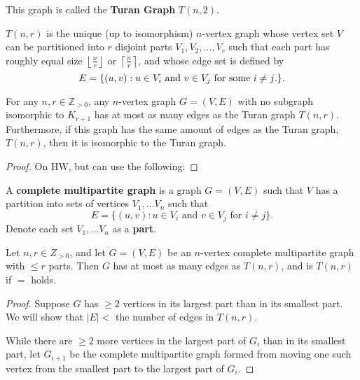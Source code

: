 
This graph is called the \textbf{Turan Graph} \( T(n, 2) \).

\begin{definition}
	\( T(n, r) \) is the unique (up to isomorphism) \( n \)-vertex graph whose vertex set \( V \) can be partitioned into \( r \) disjoint parts \( V_{1},V_{2},\ldots,V_r \) such that each part has roughly equal size \( \left\lfloor \frac{n}{r} \right\rfloor \) or \( \left\lceil \frac{n}{r} \right\rceil  \), and whose edge set is defined by \[
		E = \{(u, v) : u \in V_i \text{ and } v \in V_j \text{ for some \( i\neq j \).}\}  
	.\]  
\end{definition}

\begin{theorem}
	For any \( n,r\in \mathbb{Z}_{>0} \), any \( n \)-vertex graph \( G=(V,E) \) with no subgraph isomorphic to \( K_{r+1} \) has at most as many edges as the Turan graph \( T(n, r) \). Furthermore, if this graph has the same amount of edges as the Turan graph, \( T(n, r) \), then it is isomorphic to the Turan graph.
\end{theorem}
\begin{proof}
	On HW, but can use the following:
\end{proof}

\begin{definition}
	A \textbf{complete multipartite graph} is a graph \( G=(V,E) \) such that \( V \) has a partition into sets of vertices \( V_{1},\ldots V_n \) such that \[
		E = \{(u, v) : u \in V_i \text{ and } v \in V_j \text{ for } i\neq j\}  
	.\] Denote each set \( V_{1},\ldots V_n \) as a \textbf{part}.
\end{definition}

\begin{lemma}
	Let \( n,r \in Z_{>0}\), and let \( G=(V,E) \) be an \( n \)-vertex complete multipartite graph with \( \le r \) parts. Then \( G \) has at most as many edges as \( T(n, r) \), and is \( T(n, r) \) if \( = \) holds.
\end{lemma}
\begin{proof}
	Suppose \( G \) has \( \ge 2 \) vertices in its largest part than in its smallest part. We will show that \( |E| <  \) the number of edges in \( T(n, r) \). 

	While there are \( \ge 2 \) more vertices in the largest part of \( G_i \) than in its smallest part, let \( G_{i+1} \) be the complete multipartite graph formed from moving one such vertex from the smallest part to the largest part of \( G_i \). 
\end{proof}

